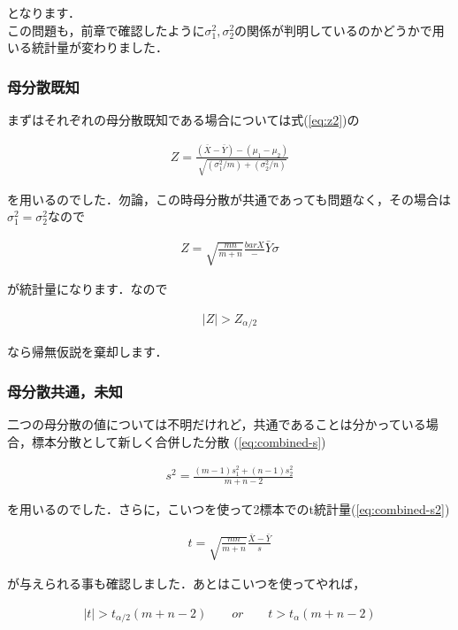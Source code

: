 \documentclass[11pt,a4paper]{ujreport} 	%
\begin{document}
となります．\\

この問題も，前章で確認したように$\sigma_1^2, \sigma_2^2$の関係が判明しているのかどうかで用いる統計量が変わりました．

\subsubsection{母分散既知}
まずはそれぞれの母分散既知である場合については式(\ref{eq:z2})の

\begin{align}
  Z = \frac{(\bar{X} - \bar{Y})-(\mu_1-\mu_2)}{\sqrt{(\sigma_1^2/m)+(\sigma_2^2/n)}}
\end{align}

を用いるのでした．勿論，この時母分散が共通であっても問題なく，その場合は$\sigma_1^2=\sigma_2^2$なので

\begin{align}
  Z = \sqrt{\frac{mn}{m+n}} \frac{bar
  X}- \bar{Y}{\sigma}
\end{align}

が統計量になります．なので

\begin{align}
  |Z| >Z_{\alpha/2}
\end{align}

なら帰無仮説を棄却します．

\subsubsection{母分散共通，未知}
二つの母分散の値については不明だけれど，共通であることは分かっている場合，標本分散として新しく合併した分散
(\ref{eq:combined-s})

\begin{align}
  s^2 = \frac{(m-1)s_1^2 + (n-1)s_2^2}{m+n-2}
\end{align}

を用いるのでした．さらに，こいつを使って2標本でのt統計量(\ref{eq:combined-s2})

\begin{align}
  t = \sqrt{\frac{mn}{m+n}} \frac{\bar{X}- \bar{Y}}{s}
\end{align}

が与えられる事も確認しました．あとはこいつを使ってやれば，

\begin{align}
  |t| > t_{\alpha/2}(m+n-2)\qquad or\qquad t>t_\alpha(m+n-2)
\end{align}
\end{document}
